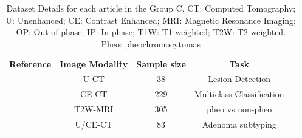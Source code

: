 \documentclass[11pt]{article}
\begin{document}
\begin{table}[]
    \centering
    \begin{tabular}{ccccc}\toprule
        \multirow{2}{*}{\textbf{Reference}} & \multirow{2}{*}{\textbf{Image Modality}} & \multirow{2}{*}{\textbf{Sample size}} & \multirow{2}{*}{\textbf{Task}} \\
        \\ \midrule
        \cite{Bi2017}                       & U-CT                                     & 38                                    & Lesion Detection               \\
        \cite{Bi2022}                       & CE-CT                                    & 229                                   & Multiclass Classification      \\
        \cite{Kong2022}                     & T2W-MRI                                  & 305                                   & pheo vs non-pheo               \\
        \cite{Zheng2020}                    & U/CE-CT                                  & 83                                    & Adenoma subtyping              \\
        \bottomrule
    \end{tabular}
    \caption{Dataset Details for each article in the Group C. CT: Computed Tomography; U: Unenhanced; CE: Contrast Enhanced; MRI: Magnetic Resonance Imaging; OP: Out-of-phase; IP: In-phase; T1W: T1-weighted; T2W: T2-weighted. Pheo: pheochromocytomas}
    \label{tab:data_C}
\end{table}
\end{document}
